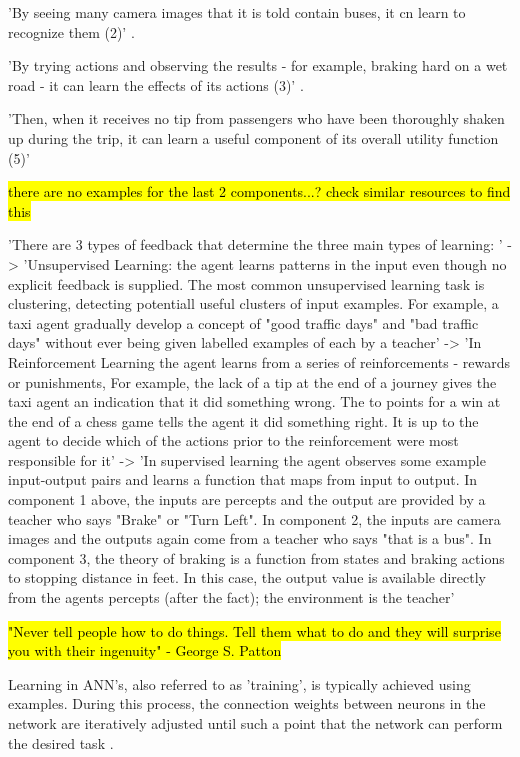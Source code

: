 'By seeing many camera images that it is told contain buses, it cn learn to recognize them (2)' \cite{russell2016artificial}.

'By trying actions and observing the results - for example, braking hard on a wet road - it can learn the effects of its actions (3)' \cite{russell2016artificial}.

'Then, when it receives no tip from passengers who have been thoroughly shaken up during the trip, it can learn a useful component of its overall utility function (5)' \cite{russell2016artificial}

\hl{there are no examples for the last 2 components...? check similar resources to find this}




'There are 3 types of feedback that determine the three main types of learning: ' \cite{russell2016artificial}
-> 'Unsupervised Learning: the agent learns patterns in the input even though no explicit feedback is supplied. The most common unsupervised learning task is clustering, detecting potentiall useful clusters of input examples. For example, a taxi agent gradually develop a concept of "good traffic days" and "bad traffic days" without ever being given labelled examples of each by a teacher'
-> 'In Reinforcement Learning the agent learns from a series of reinforcements - rewards or punishments, For example, the lack of a tip at the end of a journey gives the taxi agent an indication that it did something wrong. The to points for a win at the end of a chess game tells the agent it did something right. It is up to the agent to decide which of the actions prior to the reinforcement were most responsible for it'
-> 'In supervised learning the agent observes some example input-output pairs and learns a function that maps from input to output. In component 1 above, the inputs are percepts and the output are provided by a teacher who says "Brake" or "Turn Left". In component 2, the inputs are camera images and the outputs again come from a teacher who says "that is a bus". In component 3, the theory of braking is a function from states and braking actions to stopping distance in feet. In this case, the output value is available directly from the agents percepts (after the fact); the environment is the teacher'


\hl{"Never tell people how to do things. Tell them what to do and they will surprise you with their ingenuity" - George S. Patton}


Learning in ANN's, also referred to as 'training', is typically achieved using examples. During this process, the connection weights between neurons in the network are iteratively adjusted until such a point that the network can perform the desired task \cite{XinYao1999}.

